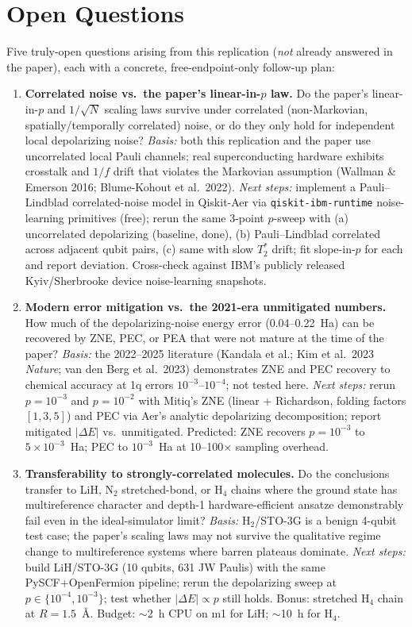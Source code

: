 \section{Open Questions}

Five truly-open questions arising from this replication (\emph{not} already answered in the paper), each with a concrete, free-endpoint-only follow-up plan:

\begin{enumerate}

\item \textbf{Correlated noise vs.\ the paper's linear-in-$p$ law.}
Do the paper's linear-in-$p$ and $1/\sqrt{N}$ scaling laws survive under
correlated (non-Markovian, spatially/temporally correlated) noise, or do
they only hold for independent local depolarizing noise?
\emph{Basis:} both this replication and the paper use uncorrelated local
Pauli channels; real superconducting hardware exhibits crosstalk and $1/f$
drift that violates the Markovian assumption (Wallman \& Emerson 2016;
Blume-Kohout et al.\ 2022).
\emph{Next steps:} implement a Pauli--Lindblad correlated-noise model in
Qiskit-Aer via \texttt{qiskit-ibm-runtime} noise-learning primitives (free);
rerun the same 3-point $p$-sweep with (a) uncorrelated depolarizing
(baseline, done), (b) Pauli--Lindblad correlated across adjacent qubit
pairs, (c) same with slow $T_2^*$ drift; fit slope-in-$p$ for each and
report deviation. Cross-check against IBM's publicly released Kyiv/Sherbrooke
device noise-learning snapshots.

\item \textbf{Modern error mitigation vs.\ the 2021-era unmitigated numbers.}
How much of the depolarizing-noise energy error (0.04--0.22~Ha) can be
recovered by ZNE, PEC, or PEA that were not mature at the time of the paper?
\emph{Basis:} the 2022--2025 literature (Kandala et al.; Kim et al.\ 2023
\emph{Nature}; van den Berg et al.\ 2023) demonstrates ZNE and PEC recovery
to chemical accuracy at 1q errors $10^{-3}$--$10^{-4}$; not tested here.
\emph{Next steps:} rerun $p{=}10^{-3}$ and $p{=}10^{-2}$ with Mitiq's ZNE
(linear + Richardson, folding factors $[1,3,5]$) and PEC via Aer's analytic
depolarizing decomposition; report mitigated $|\Delta E|$ vs.\ unmitigated.
Predicted: ZNE recovers $p{=}10^{-3}$ to $5\times10^{-3}$~Ha; PEC to
$10^{-3}$~Ha at 10--100$\times$ sampling overhead.

\item \textbf{Transferability to strongly-correlated molecules.}
Do the conclusions transfer to LiH, N$_2$ stretched-bond, or H$_4$ chains
where the ground state has multireference character and depth-1
hardware-efficient ansatze demonstrably fail even in the ideal-simulator
limit?
\emph{Basis:} H$_2$/STO-3G is a benign 4-qubit test case; the paper's
scaling laws may not survive the qualitative regime change to
multireference systems where barren plateaus dominate.
\emph{Next steps:} build LiH/STO-3G (10 qubits, 631 JW Paulis) with the
same PySCF+OpenFermion pipeline; rerun the depolarizing sweep at
$p \in \{10^{-4},10^{-3}\}$; test whether $|\Delta E| \propto p$ still
holds. Bonus: stretched H$_4$ chain at $R{=}1.5$~\AA. Budget: $\sim$2~h
CPU on m1 for LiH; $\sim$10~h for H$_4$.


\end{enumerate}
